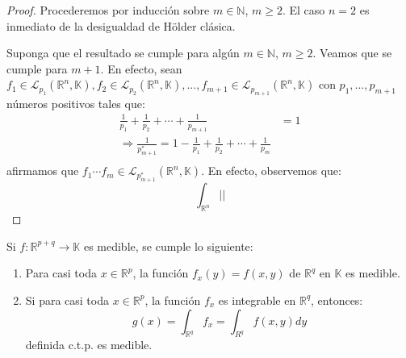 \documentclass[12pt]{report}
\theoremstyle{largebreak}
\newcommand\cf[3]{\ensuremath{#1:#2\rightarrow#3}}
\newcommand\abs[1]{\ensuremath{\big|#1\big|}}
\begin{document}
    \begin{proof}
        Procederemos por inducción sobre $m\in\mathbb{N}$, $m\geq 2$. El caso $n=2$ es inmediato de la desigualdad de Hölder clásica.

        Suponga que el resultado se cumple para algún $m\in\mathbb{N}$, $m\geq 2$. Veamos que se cumple para $m+1$. En efecto, sean $f_1\in\mathcal{L}_{p_1}(\mathbb{R}^n,\mathbb{K}),f_2\in\mathcal{L}_{p_2}(\mathbb{R}^n,\mathbb{K}),...,f_{m+1}\in\mathcal{L}_{p_{m+1}}(\mathbb{R}^n,\mathbb{K})$ con $p_1,...,p_{m+1}$ números positivos tales que:
        \begin{equation*}
            \begin{split}
                \frac{1}{p_1}+\frac{1}{p_2}+\cdots+\frac{1}{p_{m+1}}&=1\\
                \Rightarrow \frac{1}{p_{m+1}^*}=1-\frac{1}{p_1}+\frac{1}{p_2}+\cdots+\frac{1}{p_{m}} \\
            \end{split}
        \end{equation*}
        afirmamos que $f_1\cdots f_m\in\mathcal{L}_{p_{m+1}^*}(\mathbb{R}^n,\mathbb{K})$. En efecto, observemos que:
        \begin{equation*}
            \int_{\mathbb{R}^n}\abs{}
        \end{equation*}
    \end{proof}

    \begin{propo}
        Si $\cf{f}{\mathbb{R}^{p+q}}{\mathbb{K}}$ es medible, se cumple lo siguiente:
        \begin{enumerate}
            \item Para casi toda $x\in\mathbb{R}^p$, la función $f_x(y)=f(x,y)$ de $\mathbb{R}^q$ en $\mathbb{K}$ es medible.
            \item Si para casi toda $x\in\mathbb{R}^p$, la función $f_x$ es integrable en $\mathbb{R}^q$, entonces:
            \begin{equation*}
                g(x)=\int_{\mathbb{R}^q}f_x=\int_{R^q}f(x,y)dy
            \end{equation*}
            definida c.t.p. es medible.
        \end{enumerate}
    \end{propo}
\end{document}
